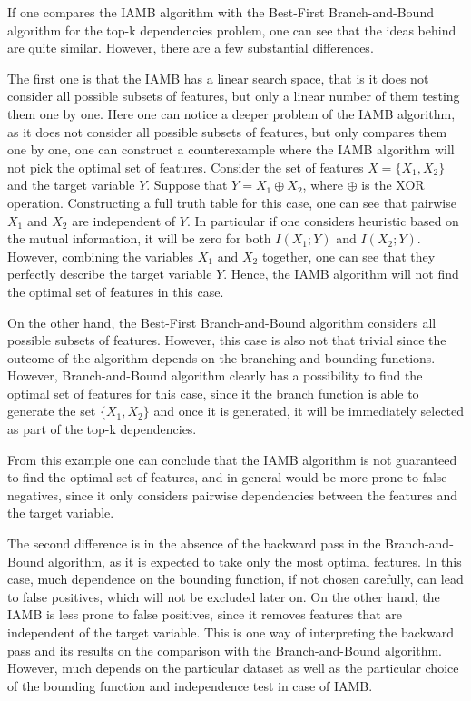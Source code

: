 \documentclass{article}
\begin{document}
If one compares the IAMB algorithm with the Best-First Branch-and-Bound algorithm for the top-k dependencies problem, one can see that the ideas behind are quite similar. However, there are a few substantial differences. 

The first one is that the IAMB has a linear search space, that is it does not consider all possible subsets of features, but only a linear number of them testing them one by one. Here one can notice a deeper problem of the IAMB algorithm, as it does not consider all possible subsets of features, but only compares them one by one, one can construct a counterexample where the IAMB algorithm will not pick the optimal set of features. Consider the set of features $X = \{X_1, X_2\}$ and the target variable $Y$. Suppose that $Y=X_1 \oplus X_2$, where $\oplus$ is the XOR operation. Constructing a full truth table for this case, one can see that pairwise $X_1$ and $X_2$ are independent of $Y$. In particular if one considers heuristic based on the mutual information, it will be zero for both $I(X_1; Y)$ and $I(X_2; Y)$. However, combining the variables $X_1$ and $X_2$ together, one can see that they perfectly describe the target variable $Y$. Hence, the IAMB algorithm will not find the optimal set of features in this case. 

On the other hand, the Best-First Branch-and-Bound algorithm considers all possible subsets of features. However, this case is also not that trivial since the outcome of the algorithm depends on the branching and bounding functions. However, Branch-and-Bound algorithm clearly has a possibility to find the optimal set of features for this case, since it the branch function is able to generate the set $\{X_1, X_2\}$ and once it is generated, it will be immediately selected as part of the top-k dependencies. 

From this example one can conclude that the IAMB algorithm is not guaranteed to find the optimal set of features, and in general would be more prone to false negatives, since it only considers pairwise dependencies between the features and the target variable.

The second difference is in the absence of the backward pass in the Branch-and-Bound algorithm, as it is expected to take only the most optimal features. In this case, much dependence on the bounding function, if not chosen carefully, can lead to false positives, which will not be excluded later on. On the other hand, the IAMB is less prone to false positives, since it removes features that are independent of the target variable. This is one way of interpreting the backward pass and its results on the comparison with the Branch-and-Bound algorithm. However, much depends on the particular dataset as well as the particular choice of the bounding function and independence test in case of IAMB.
\end{document}

